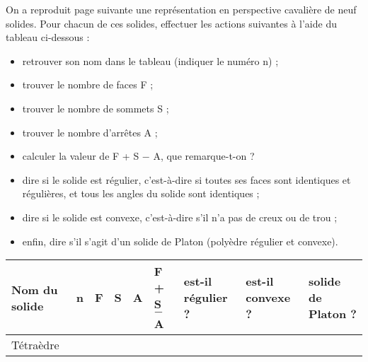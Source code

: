  \begin{enigme}
    \begin{changemargin}{-10mm}{-10mm}
        On a reproduit page suivante une représentation en perspective cavalière de neuf solides. Pour chacun de ces solides, effectuer les actions suivantes à l'aide du tableau ci-dessous :
        \begin{itemize}
           \item retrouver son nom dans le tableau (indiquer le numéro n) ;
           \item trouver le nombre de faces F ;
           \item trouver le nombre de sommets S ;
           \item trouver le nombre d'arrêtes A ;
           \item calculer la valeur de F + S $-$ A, que remarque-t-on ?
           \item dire si le solide est régulier, c'est-à-dire si toutes ses faces sont identiques et régulières, et tous les angles du solide sont identiques ;
           \item dire si le solide est convexe, c'est-à-dire s'il n'a pas de \og creux \fg{} ou de trou ;
           \item enfin, dire s'il s'agit d'un solide de Platon (polyèdre régulier et convexe).
        \end{itemize}
        \begin{center}   
           {\renewcommand{\arraystretch}{2.2}
           \begin{tabular}{|>{\centering\arraybackslash}m{2.5cm}|>{\centering\arraybackslash}p{0.9cm}|>{\centering\arraybackslash}p{0.9cm}|>{\centering\arraybackslash}p{0.9cm}|>{\centering\arraybackslash}p{0.9cm}|>{\centering\arraybackslash}p{1.9cm}|>{\centering\arraybackslash}m{1.4cm}|>{\centering\arraybackslash}m{1.4cm}|>{\centering\arraybackslash}m{1.4cm}|}
              \hline
              \rowcolor{LightGray}Nom du solide & n & F & S & A & F + S $-$ A & est-il régulier ? & est-il convexe ? & solide de Platon ? \\
              \hline
              \cellcolor{LightGray}Tétraèdre & & & & & & & & \\

\end{tabular}}
\end{center}
\end{changemargin}
\end{enigme}
